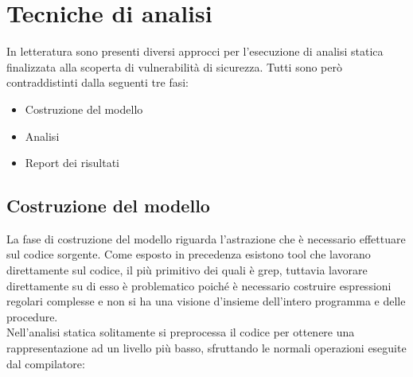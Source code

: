 \section{Tecniche di analisi}
In letteratura sono presenti diversi approcci per l'esecuzione di analisi statica finalizzata alla scoperta di vulnerabilità di sicurezza. Tutti sono però contraddistinti dalla seguenti tre fasi:
\begin{itemize}
\item Costruzione del modello
\item Analisi
\item Report dei risultati
\end{itemize}

\subsection{Costruzione del modello}
La fase di costruzione del modello riguarda l'astrazione che è necessario effettuare sul codice sorgente. Come esposto in precedenza esistono tool che lavorano direttamente sul codice, il più primitivo dei quali è grep, tuttavia lavorare direttamente su di esso è problematico poiché è necessario costruire espressioni regolari complesse e non si ha una visione d'insieme dell'intero programma e delle procedure.\\
Nell'analisi statica solitamente si preprocessa il codice per ottenere una rappresentazione ad un livello più basso, sfruttando le normali operazioni eseguite dal compilatore:
